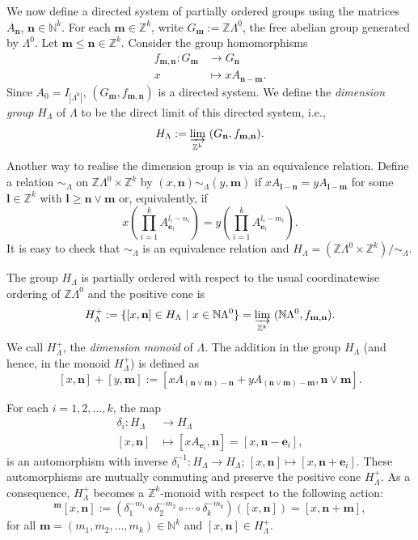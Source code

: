 \documentclass[12pt]{amsart}
\newcommand{\N}{\mathbf{n}}
\newcommand{\M}{\mathbf{m}}
\theoremstyle{definition}
\theoremstyle{remark}
\begin{document}
We now define a directed system of partially ordered groups using the matrices $A_\N$, $\N\in \mathbb{N}^k$. For each $\M\in \mathbb{Z}^k$, write $G_\M:=\mathbb{Z}\Lambda^0$, the free abelian group generated by $\Lambda^0$. Let $\M\le \N\in \mathbb{Z}^k$. Consider the group homomorphisms 
\begin{align*}
    f_{\M,\N}:G_\M &\longrightarrow G_\N\\
    x &\longmapsto xA_{\N-\M}.
\end{align*}
Since $A_0=I_{|\Lambda^0|}$, $(G_\M,f_{\M,\N})$ is a directed system. We define the \emph{dimension group} $H_\Lambda$ of $\Lambda$ to be the direct limit of this directed system, i.e., \[H_\Lambda:=\displaystyle{\varinjlim_{\mathbb{Z}^k}}~ (G_\N,f_{\M,\N}).\]
Another way to realise the dimension group is via an equivalence relation. Define a relation $\sim_\Lambda$ on $\mathbb{Z}\Lambda^0\times \mathbb{Z}^k$ by $(x,\N)\sim_\Lambda (y,\M)$ if $xA_{\mathbf{l}-\N}=yA_{\mathbf{l}-\M}$ for some $\mathbf{l}\in \mathbb{Z}^k$ with $\mathbf{l}\ge \N\vee \M$ or, equivalently, if \[x\left(\displaystyle{\prod_{i=1}^{k}} A_{\mathbf{e}_i}^{l_i-n_i}\right)=y\left(\displaystyle{\prod_{i=1}^{k}} A_{\mathbf{e}_i}^{l_i-m_i}\right).\] It is easy to check that $\sim_\Lambda$ is an equivalence relation and $H_\Lambda=(\mathbb{Z}\Lambda^0\times \mathbb{Z}^k)/\sim_\Lambda$.

The group $H_\Lambda$ is partially ordered with respect to the usual coordinatewise ordering of $\mathbb{Z}\Lambda^0$ and the positive cone is
\[H_\Lambda^+:=\{[x,\N]\in H_\Lambda~|~x\in \mathbb{N}\Lambda^0\}=\displaystyle{\varinjlim_{\mathbb{Z}^k}}~ (\mathbb{N}\Lambda^0,f_{\M,\N}).\]
We call $H_\Lambda^+$, the \emph{dimension monoid} of $\Lambda$. The addition in the group $H_\Lambda$ (and hence, in the monoid $H_\Lambda^+$) is defined as \[[x,\N]+[y,\M]:=[xA_{(\N\vee \M) -\N}+yA_{(\N\vee \M) -\M},\N\vee \M].\] 

For each $i=1,2,\ldots,k$, the map 
\begin{align}\label{shifts}
\delta_i:H_\Lambda &\longrightarrow H_\Lambda\\
\nonumber [x,\N] &\longmapsto [xA_{\mathbf{e}_i},\N]=[x,\N-\mathbf{e}_i],
\end{align}
is an automorphism with inverse $\delta_i^{-1}:H_\Lambda\longrightarrow H_\Lambda$; $[x,\N]\longmapsto [x,\N+\mathbf{e}_i]$. These automorphisms are mutually commuting and preserve the positive cone $H_\Lambda^+$. As a consequence, $H_\Lambda^+$ becomes a $\mathbb{Z}^k$-monoid with respect to the following action:
\begin{equation}\label{acteqn}
^\M[x,\N]:=(\delta_1^{-m_1}\circ \delta_2^{-m_2}\circ \cdots \circ \delta_{k}^{-m_k})([x,\N])=[x,\N+\M], 
\end{equation}
for all $\M=(m_1,m_2,\ldots,m_k)\in \mathbb{N}^k$ and $[x,\N]\in H_\Lambda^+$. 
\end{document}
